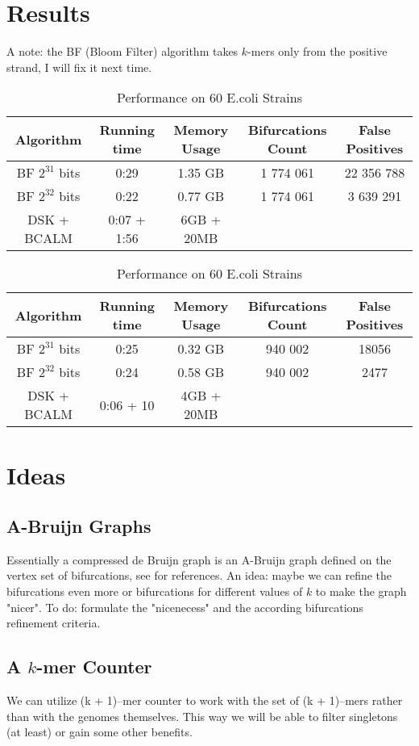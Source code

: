 \documentclass[a4paper, 12pt]{scrartcl}
\begin{document}
\section{Results}
A note: the BF (Bloom Filter) algorithm takes $k$-mers only from the positive strand, I will fix it next time.
\begin{table}[h]

\begin{center}
\caption{Performance Human Chromosome 1}
\begin{tabular}{ccccc}
\hline
Algorithm  & Running time & Memory Usage & Bifurcations Count & False Positives\\
\hline
BF $2^{31}$ bits & 0:29 & 1.35 GB & 1 774 061 & 22 356 788 \\
BF $2^{32}$ bits & 0:22 & 0.77 GB & 1 774 061 & 3 639 291  \\
DSK + BCALM   & 0:07 + 1:56 & 6GB + 20MB & \\
\hline
\end{tabular}

\caption{Performance on 60 E.coli Strains}
\begin{tabular}{ccccc}
\hline
Algorithm  & Running time & Memory Usage & Bifurcations Count & False Positives\\
\hline
BF $2^{31}$ bits & 0:25 & 0.32 GB & 940 002 & 18056 \\
BF $2^{32}$ bits & 0:24 & 0.58 GB & 940 002 & 2477  \\
DSK + BCALM   & 0:06 + 10 &  4GB + 20MB & \\
\hline
\end{tabular}
\end{center}
\end{table}


\section{Ideas}
\subsection{A-Bruijn Graphs}
Essentially a compressed de Bruijn graph is an A-Bruijn graph defined on the vertex set of bifurcations, see \cite{lin2014manifold} for references.
An idea: maybe we can refine the bifurcations even more or bifurcations for different values of $k$ to make the graph "nicer".
To do: formulate the "nicenecess" and the according bifurcations refinement criteria.
\subsection{A $k$-mer Counter}
We can utilize (k + 1)--mer counter to work with the set of (k + 1)--mers rather than with the genomes themselves.
This way we will be able to filter singletons (at least) or gain some other benefits.
\begin{spacing}{0.9}


\end{spacing}
\end{document}
